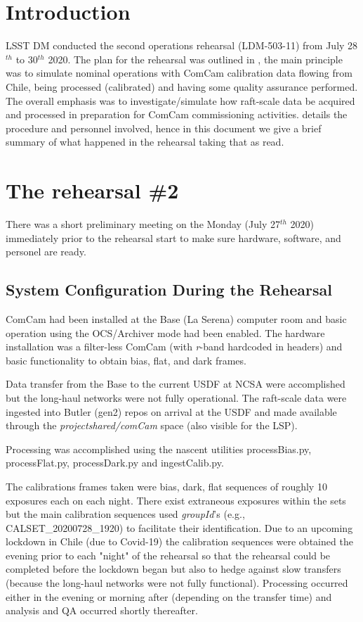 \section{Introduction} \label{sec:intro}

LSST DM conducted the second operations rehearsal (LDM-503-11) from July 28$^{th}$ to 30$^{th}$ 2020.
The plan for the rehearsal was outlined in , the main principle was to simulate
nominal operations with ComCam calibration data flowing from Chile, being processed (calibrated) 
and having some quality assurance performed.  The overall emphasis was to investigate/simulate how
raft-scale data be acquired and processed in preparation for ComCam commissioning activities.
 details the procedure and personnel involved,
hence in this document we give a brief summary of what  happened in the rehearsal taking that as read.


\section{The rehearsal \#2}

There was a short preliminary meeting on the Monday (July 27$^{th}$ 2020) immediately prior to the 
rehearsal start to make sure hardware, software, and personel are ready. 

\subsection{System Configuration During the Rehearsal} \label{sec:setup}

ComCam had been installed at the Base (La Serena) computer room and basic operation using the OCS/Archiver
mode had been enabled.  The hardware installation was a filter-less ComCam (with {\it r}-band hardcoded
in headers) and basic functionality to obtain bias, flat, and dark frames.

Data transfer from the Base to the current USDF at NCSA were accomplished but the long-haul networks were not
fully operational.  The raft-scale data were ingested into Butler (gen2) repos on arrival at the USDF 
and made available through the {\it \/project\/shared/comCam} space (also visible for the LSP).  

Processing was accomplished using the nascent utilities processBias.py, processFlat.py, processDark.py
and ingestCalib.py.

The calibrations frames taken were bias, dark, flat sequences of roughly 10 exposures each on each night.  
There exist extraneous exposures within the sets but the main calibration sequences used {\it groupId}'s 
(e.g., CALSET\_20200728\_1920) to facilitate their identification.  Due to an upcoming lockdown in Chile 
(due to Covid-19) the calibration sequences were obtained the evening prior to each "night" of the 
rehearsal so that the rehearsal could be completed before the lockdown began but also to hedge against 
slow transfers (because the long-haul networks were not fully functional).  Processing occurred either
in the evening or morning after (depending on the transfer time) and analysis and QA occurred
shortly thereafter.

